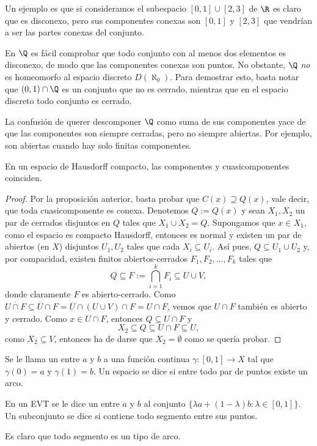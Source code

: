 \documentclass[topologia-analisis.tex]{subfiles}
\begin{document}
Un ejemplo es que si consideramos el subespacio $[0,1]\cup[2,3]$ de $\R$ es claro que es disconexo,
pero sus componentes conexas son $[0,1]$ y $[2,3]$ que vendrían a ser las partes conexas del conjunto.

\begin{ex}
	En $\Q$ es fácil comprobar que todo conjunto con al menos dos elementos es disconexo, de modo que las componentes conexas son puntos.
	No obstante, $\Q$ \textit{no} es homeomorfo al espacio discreto $D(\aleph_0)$.
	Para demostrar esto, basta notar que $(0, 1) \cap \Q$ es un conjunto que no es cerrado, mientras que en el espacio discreto todo conjunto es cerrado.

	La confusión de querer descomponer $\Q$ como suma de sus componentes yace de que las componentes son siempre cerradas, pero no siempre abiertas.
	Por ejemplo, son abiertas cuando hay solo finitas componentes.
\end{ex}
\begin{prop}
	En un espacio de Hausdorff compacto, las componentes y cuasicomponentes coinciden.
\end{prop}
\begin{proof}
	Por la proposición anterior, basta probar que $C(x) \supseteq Q(x)$, vale decir, que toda cuasicomponente es conexa.
	Denotemos $Q := Q(x)$ y sean $X_1, X_2$ un par de cerrados disjuntos en $Q$ tales que $X_1 \cup X_2 = Q$.
	Supongamos que $x \in X_1$, como el espacio es compacto Hausdorff, entonces es normal y existen un par de abiertos (en $X$) disjuntos $U_1, U_2$
	tales que cada $X_i \subseteq U_i$.
	Así pues, $Q \subseteq U_1 \cup U_2$ y, por compacidad, existen finitos abiertos-cerrados $F_1, F_2, \dots, F_k$ tales que
	$$ Q \subseteq F := \bigcap_{i=1}^{k} F_i \subseteq U \cup V, $$
	donde claramente $F$ es abierto-cerrado. Como $\overline{U \cap F} \subseteq \overline{U} \cap F = \overline{U} \cap (U \cup V) \cap F = U \cap F$,
	vemos que $U \cap F$ también es abierto y cerrado.
	Como $x \in U \cap F$, entonces $Q \subseteq U \cap F$ y
	$$ X_2 \subseteq Q \subseteq U \cap F \subseteq U, $$
	como $X_2 \subseteq V$, entonces ha de darse que $X_2 = \emptyset$ como se quería probar.
\end{proof}

\begin{mydefi}
	Se le llama un  entre $a$ y $b$ a una función continua $\gamma\colon [0,1]\to X$ tal que $\gamma(0) = a$ y $\gamma(1) = b$.
	Un espacio se dice  si entre todo par de puntos existe un arco.

	En un EVT se le dice un  entre $a$ y $b$ al conjunto $\{\lambda a + (1-\lambda)b: \lambda\in[0,1]\}$.
	Un subconjunto se dice  si contiene todo segmento entre sus puntos.
\end{mydefi}
Es claro que todo segmento es un tipo de arco.
\end{document}
